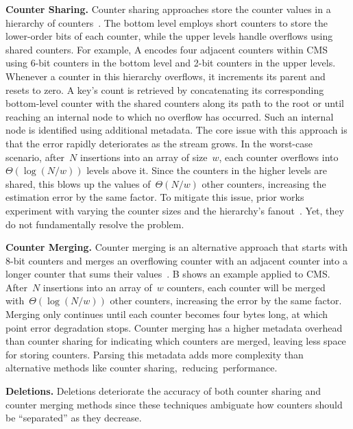 \documentclass[sigconf]{acmart}
\begin{document}
\textbf{Counter Sharing.}
Counter sharing approaches store the counter values in a hierarchy of counters~\cite{CounterTree}.
The bottom level employs short counters to store the lower-order bits of each counter, while the upper levels handle overflows using shared counters.
For example, A encodes four adjacent counters within CMS using 6{\nobreakdash-}bit counters in the bottom level and 2{\nobreakdash-}bit counters in the upper levels.
Whenever a counter in this hierarchy overflows, it increments its parent and resets to zero.
A key's count is retrieved by concatenating its corresponding bottom-level counter with the shared counters along its path to the root or until reaching an internal node to which no overflow has occurred.
Such an internal node is identified using additional metadata.
The core issue with this approach is that the error rapidly deteriorates as the stream grows.
In the worst-case scenario, after~$N$ insertions into an array of size~$w$, each counter overflows into~$\Theta(\log (N/w))$ levels above it.
Since the counters in the higher levels are shared, this blows up the values of~$\Theta(N/w)$ other counters, increasing the estimation error by the same factor.
To mitigate this issue, prior works experiment with varying the counter sizes and the hierarchy's fanout~\cite{BitSense,PyramidSketch,StingySketch,AdaptiveCounterSplicing,TreeSensing,TailoredSketch}.
Yet, they do not fundamentally resolve the problem.

\textbf{Counter Merging.}
Counter merging is an alternative approach that starts with 8-bit counters and merges an overflowing counter with an adjacent counter into a longer counter that sums their values~\cite{SALSA}.
B shows an example applied to CMS. After~$N$ insertions into an array of~$w$ counters, each counter will be merged with~$\Theta(\log (N/w))$ other counters, increasing the error by the same factor.
Merging only continues until each counter becomes four bytes long, at which point error degradation stops.
Counter merging has a higher metadata overhead than counter sharing for indicating which counters are merged, leaving less space for storing counters.
Parsing this metadata adds more complexity than alternative methods like counter sharing,~reducing~performance.

\textbf{Deletions.}
Deletions deteriorate the accuracy of both counter sharing and counter merging methods since these techniques ambiguate how counters should be ``separated'' as they decrease.
\end{document}
